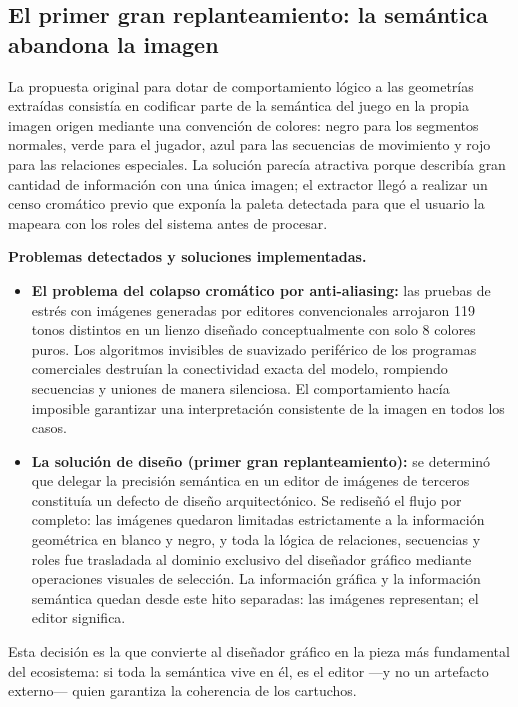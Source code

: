 \subsection{El primer gran replanteamiento: la semántica abandona la imagen}
\label{sec:F1Replanteo}

La propuesta original para dotar de comportamiento lógico a las
geometrías extraídas consistía en codificar parte de la semántica del
juego en la propia imagen origen mediante una convención de colores:
negro para los segmentos normales, verde para el jugador, azul para
las secuencias de movimiento y rojo para las relaciones especiales.
La solución parecía atractiva porque describía gran cantidad de
información con una única imagen; el extractor llegó a realizar un
censo cromático previo que exponía la paleta detectada para que el
usuario la mapeara con los roles del sistema antes de procesar.

\textbf{Problemas detectados y soluciones implementadas.}

\begin{itemize}
	\item \textbf{El problema del colapso cromático por anti-aliasing:}
	las pruebas de estrés con imágenes generadas por editores
	convencionales arrojaron 119 tonos distintos en un lienzo diseñado
	conceptualmente con solo 8 colores puros. Los algoritmos invisibles de
	suavizado periférico de los programas comerciales destruían la
	conectividad exacta del modelo, rompiendo secuencias y uniones de
	manera silenciosa. El comportamiento hacía imposible garantizar una
	interpretación consistente de la imagen en todos los casos.
	\item \textbf{La solución de diseño (primer gran replanteamiento):} se
	determinó que delegar la precisión semántica en un editor de imágenes
	de terceros constituía un defecto de diseño arquitectónico. Se
	rediseñó el flujo por completo: las imágenes quedaron limitadas
	estrictamente a la información geométrica en blanco y negro, y toda
	la lógica de relaciones, secuencias y roles fue trasladada al dominio
	exclusivo del diseñador gráfico mediante operaciones visuales de
	selección. La información gráfica y la información semántica quedan
	desde este hito separadas: las imágenes representan; el editor
	significa.
\end{itemize}

Esta decisión es la que convierte al diseñador gráfico en la pieza
más fundamental del ecosistema: si toda la semántica vive en él, es
el editor —y no un artefacto externo— quien garantiza la coherencia
de los cartuchos.

